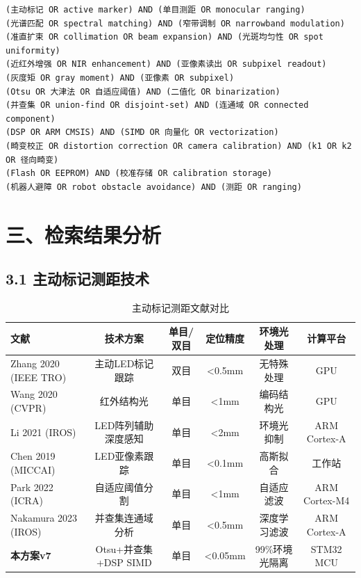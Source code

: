 \documentclass[12pt,a4paper]{article}
\begin{document}
\begin{verbatim}
(主动标记 OR active marker) AND (单目测距 OR monocular ranging)
(光谱匹配 OR spectral matching) AND (窄带调制 OR narrowband modulation)
(准直扩束 OR collimation OR beam expansion) AND (光斑均匀性 OR spot uniformity)
(近红外增强 OR NIR enhancement) AND (亚像素读出 OR subpixel readout)
(灰度矩 OR gray moment) AND (亚像素 OR subpixel)
(Otsu OR 大津法 OR 自适应阈值) AND (二值化 OR binarization)
(并查集 OR union-find OR disjoint-set) AND (连通域 OR connected component)
(DSP OR ARM CMSIS) AND (SIMD OR 向量化 OR vectorization)
(畸变校正 OR distortion correction OR camera calibration) AND (k1 OR k2 OR 径向畸变)
(Flash OR EEPROM) AND (校准存储 OR calibration storage)
(机器人避障 OR robot obstacle avoidance) AND (测距 OR ranging)
\end{verbatim}

\newpage

\section{三、检索结果分析}

\subsection{3.1 主动标记测距技术}

\begin{table}[H]
\centering
\caption{主动标记测距文献对比}
\begin{tabular}{lccccc}
\toprule
文献 & 技术方案 & 单目/双目 & 定位精度 & 环境光处理 & 计算平台 \\
\midrule
Zhang 2020 (IEEE TRO) & 主动LED标记跟踪 & 双目 & <0.5mm & 无特殊处理 & GPU \\
Wang 2020 (CVPR) & 红外结构光 & 单目 & <1mm & 编码结构光 & GPU \\
Li 2021 (IROS) & LED阵列辅助深度感知 & 单目 & <2mm & 环境光抑制 & ARM Cortex-A \\
Chen 2019 (MICCAI) & LED亚像素跟踪 & 单目 & <0.1mm & 高斯拟合 & 工作站 \\
Park 2022 (ICRA) & 自适应阈值分割 & 单目 & <1mm & 自适应滤波 & ARM Cortex-M4 \\
Nakamura 2023 (IROS) & 并查集连通域分析 & 单目 & <0.5mm & 深度学习滤波 & ARM Cortex-A \\
\textbf{本方案v7} & Otsu+并查集+DSP SIMD & 单目 & <0.05mm & 99\%环境光隔离 & STM32 MCU \\
\bottomrule
\end{tabular}
\end{table}
\end{document}
